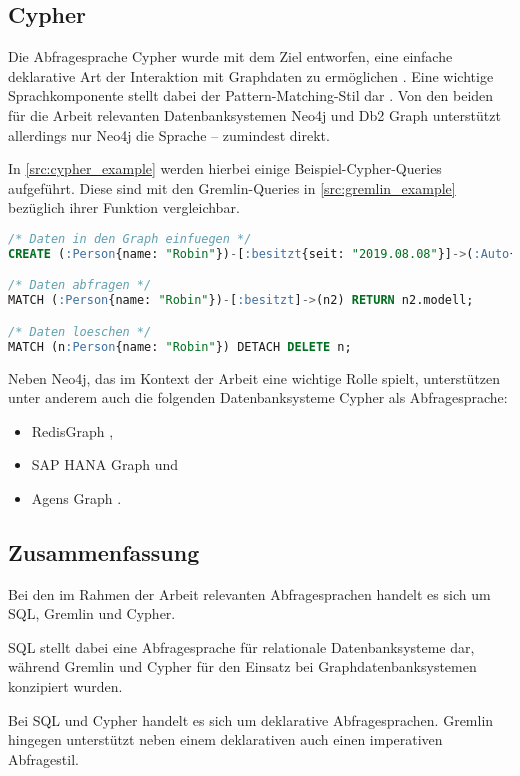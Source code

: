 \subsection{Cypher}
Die Abfragesprache Cypher wurde mit dem Ziel entworfen, eine einfache deklarative Art der Interaktion mit Graphdaten zu ermöglichen \cite{gdbms}. Eine wichtige Sprachkomponente stellt dabei der Pattern-Matching-Stil dar \cite{gdbms}. Von den beiden für die Arbeit relevanten Datenbanksystemen Neo4j und Db2 Graph unterstützt allerdings nur Neo4j die Sprache -- zumindest direkt. 

In \autoref{src:cypher_example} werden hierbei einige Beispiel-Cypher-Queries aufgeführt. Diese sind mit den Gremlin-Queries in \autoref{src:gremlin_example} bezüglich ihrer Funktion vergleichbar. 

\begin{lstlisting}[caption={Beispiel Cypher-Queries},language=SQL,label=src:cypher_example]
/* Daten in den Graph einfuegen */
CREATE (:Person{name: "Robin"})-[:besitzt{seit: "2019.08.08"}]->(:Auto{modell: "Leaf"});

/* Daten abfragen */
MATCH (:Person{name: "Robin"})-[:besitzt]->(n2) RETURN n2.modell;

/* Daten loeschen */
MATCH (n:Person{name: "Robin"}) DETACH DELETE n;
\end{lstlisting}

Neben Neo4j, das im Kontext der Arbeit eine wichtige Rolle spielt, unterstützen unter anderem auch die folgenden Datenbanksysteme Cypher als Abfragesprache:
\begin{itemize}
    \item RedisGraph \cite{redisgraph_2021},
    \item SAP HANA Graph \cite{opencypher_2021} und
    \item Agens Graph \cite{opencypher_2021}.
\end{itemize}

\subsection{Zusammenfassung}
Bei den im Rahmen der Arbeit relevanten Abfragesprachen handelt es sich um SQL, Gremlin und Cypher. 

SQL stellt dabei eine Abfragesprache für relationale Datenbanksysteme dar, während Gremlin und Cypher für den Einsatz bei Graphdatenbanksystemen konzipiert wurden. 

Bei SQL und Cypher handelt es sich um deklarative Abfragesprachen. Gremlin hingegen unterstützt neben einem deklarativen auch einen imperativen Abfragestil. 